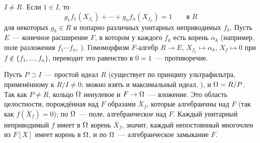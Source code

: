 \emph{$I\ne R$.} Если $1\in I$, то
\[
g_1f_1(X_{f_1})+\cdots+g_nf_n(X_{f_n})=1\qquad\text{в }R
\]
для некоторых $g_k\in R$ и попарно различных унитарных неприводимых $f_k$. Пусть $E$~--- конечное расширение $F$, в котором у каждого
$f_k$ есть корень $\alpha_k$ (например, поле разложения $f_1\cdots f_n$, ). Гомоморфизм $F$-алгебр $R\to E$,
$X_{f_k}\mapsto\alpha_k$, $X_f\mapsto0$ при $f\notin\{f_1,\dots,f_n\}$, переводит это равенство в $0=1$~---
противоречие.

Пусть $P\supset I$~--- простой идеал $R$ (существует по принципу ультрафильтра, применённому к $R/I\ne0$; можно взять и
максимальный идеал, ), и $\Omega=R/P$. Так как $P\ne R$, кольцо $\Omega$ ненулевое и $F\to\Omega$~--- вложение. Это
область целостности, порождённая над $F$ образами $\bar X_f$, которые алгебраичны над $F$ (так как $f(\bar X_f)=0$);
по  $\Omega$~--- поле, алгебраическое над $F$.
Каждый унитарный неприводимый $f$ имеет в $\Omega$ корень $\bar X_f$, значит, каждый непостоянный многочлен из $F[X]$ имеет
корень в $\Omega$, и по  $\Omega$~--- алгебраическое замыкание $F$.

